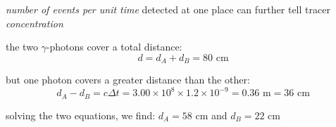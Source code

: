 \emph{number of events per unit time} detected at one place can further tell tracer \emph{concentration}


\sol the two $\gamma$-photons cover a total distance:
\begin{equation*}
	d = d_A + d_B = 80 \text{ cm}
\end{equation*}

but one photon covers a greater distance than the other:
\begin{equation*}
	d_A - d_B = c \Delta t = 3.00\times10^8 \times 1.2 \times 10^{-9} = 0.36 \text{ m} = 36 \text{ cm}
\end{equation*}

solving the two equations, we find: $d_A = 58 \text{ cm}$ and $d_B = 22 \text{ cm}$ \eoe